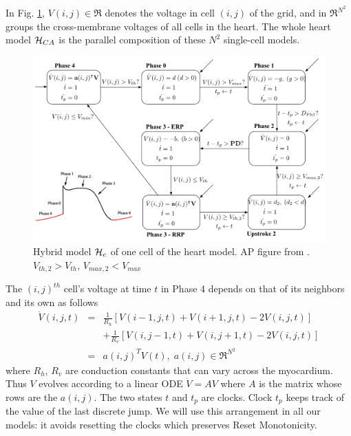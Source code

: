 In Fig. \ref{fig:cellaut}, $V(i,j) \in \Re$ denotes the voltage in cell $(i,j)$ of the grid, and  in $\Re^{N^2}$ groups the cross-membrane voltages of all cells in the heart.
The whole heart model $\mathcal{H}_{CA}$ is the parallel composition of these $N^2$ single-cell models. 
\begin{figure}[t]
	\centering
	\includegraphics[scale=0.26]{figures/cellaut1v2}
	\vspace{-10pt}
	\caption{Hybrid model $\mathcal{H}_c$ of one cell of the heart model. AP figure from \cite{eplab}. 
		$V_{th,2}>V_{th}$, $V_{max,2}<V_{max}$}
	\vspace{-20pt}
	\label{fig:cellaut}
\end{figure}
%
The $(i,j)^{th}$ cell's voltage at time $t$ in Phase 4 depends on that of its neighbors and its own as follows \cite{Spector11_Emergence}
\begin{eqnarray}
\dot{V}(i,j,t) &=& \frac{1}{R_h}[V(i-1,j,t)+V(i+1,j,t) - 2V(i,j,t)] 
\nonumber \\ 
&& +  \frac{1}{R_v}[V(i,j-1,t) +  V(i,j+1,t) - 2V(i,j,t)]  
\nonumber\\
&=& a(i,j)^TV(t), \; a(i,j) \in \Re^{N^2}
\;
\end{eqnarray}
where $R_h$, $R_v$ are conduction constants that can vary across the myocardium.
Thus $V$ evolves according to a linear ODE $\dot{V} = AV$ where $A$ is the matrix whose rows are the $a(i,j)$. 
The two states $t$ and $t_p$ are clocks.
Clock $t_{p}$ keeps track of the value of the last discrete jump. 
We will use this arrangement in all our models: it avoids resetting the clocks which preserves Reset Monotonicity.

